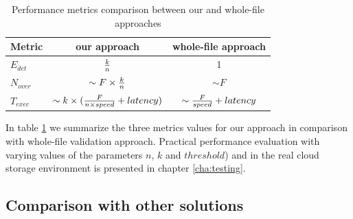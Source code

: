 \begin{table}[h!]
\centering
\begin{tabular}{|l||c|c|}
	\hline
	Metric     & our approach                                           & whole-file approach \\ \hline \hline
	$E_{det}$  & ${k \over n}$                                          & 1 \\ \hline
	$N_{over}$ & $\sim F \times {k \over n}$                            & $\sim F$ \\ \hline
	$T_{exec}$ & $\sim k \times ({F \over {n \times speed}} + latency)$ & $\sim {F \over speed} + latency$ \\ \hline
\end{tabular}
\caption{Performance metrics comparison between our and whole-file approaches}
\label{tab:metrics-comparison}
\end{table}

In table \ref{tab:metrics-comparison} we summarize the three metrics values
for our approach in comparison with whole-file validation approach. Practical
performance evaluation with varying values of the parameters $n$, $k$ and
$threshold$) and in the real cloud storage environment is presented in chapter
\ref{cha:testing}.

		\subsection{Comparison with other solutions}
